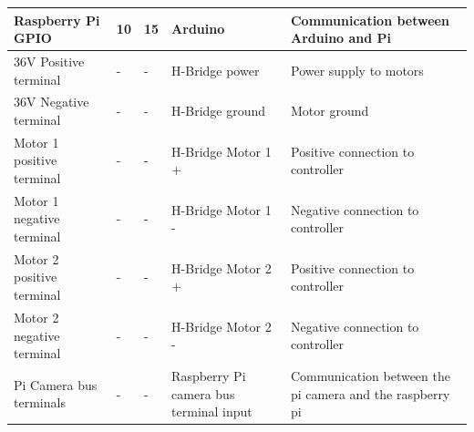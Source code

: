 \documentclass [10pt]{article}
\begin{document}
{\begin{tabular}{|l|l|l|l|l|}
		Raspberry Pi GPIO         & 10                & 15            & Arduino                                & Communication between Arduino and Pi                                                                                                                                             \\ \hline
		36V Positive terminal     & -                 & -             & H-Bridge power                         & Power supply to motors                                                                                                                                                           \\ \hline
		36V Negative terminal     & -                 & -             & H-Bridge ground                        & Motor ground                                                                                                                                                                     \\ \hline
		Motor 1 positive terminal & -                 & -             & H-Bridge Motor 1 +                     & Positive connection to controller                                                                                                                                                \\ \hline
		Motor 1 negative terminal & -                 & -             & H-Bridge Motor 1 -                     & Negative connection to controller                                                                                                                                                \\ \hline
		Motor 2 positive terminal & -                 & -             & H-Bridge Motor 2 +                     & Positive connection to controller                                                                                                                                                \\ \hline
		Motor 2 negative terminal & -                 & -             & H-Bridge Motor 2 -                     & Negative connection to controller                                                                                                                                                \\ \hline
		Pi Camera bus terminals   & -                 & -             & Raspberry Pi camera bus terminal input & Communication between the pi camera and the raspberry pi                                                                                                                         \\ \hline
	\end{tabular}%
}
\end{document}
